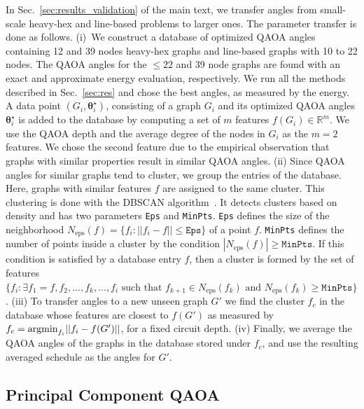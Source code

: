 \documentclass[twocolumn,
english,
aps,
pra,
10pt,
longbibliography,
superscriptaddress,
amsmath,
amssymb,
floatfix
]{revtex4-2}
\begin{document}
{In Sec.~\ref{sec:results_validation} of the main text, we transfer angles from small-scale heavy-hex and line-based problems to larger ones.
The parameter transfer is done as follows.
(i)~We construct a database of optimized QAOA angles containing 12 and 39 nodes heavy-hex graphs and line-based graphs with 10 to 22 nodes.
The QAOA angles for the  $\leq 22$ and 39 node graphs are found with an exact and approximate energy evaluation, respectively.
We run all the methods described in Sec.~\ref{sec:res} and chose the best angles, as measured by the energy.  
A data point $(G_i, \boldsymbol{\theta}_i^\star)$, consisting of a graph $G_i$ and its optimized QAOA angles $\boldsymbol{\theta}^\star_i$ is added to the database by computing a set of $m$ features $f(G_i)\in\mathbb{R}^m$.
We use the QAOA depth and the average degree of the nodes in $G_i$ as the $m=2$ features. 
We chose the second feature due to the empirical observation that graphs with similar properties result in similar QAOA angles.
(ii)
Since QAOA angles for similar graphs tend to cluster, we group the entries of the database.
Here, graphs with similar features $f$ are assigned to the same cluster. 
This clustering is done with the DBSCAN algorithm~\cite{ester1996density, pedregosa2011scikit}.
It detects clusters based on density and has two parameters \texttt{Eps} and \texttt{MinPts}. 
\texttt{Eps} defines the size of the neighborhood $N_\text{eps}(f) = \{f_i: ||f_i-f||\leq \texttt{Eps}\}$ of a point $f$.
\texttt{MinPts} defines the number of points inside a cluster by the condition $|N_\text{eps}(f)|\geq \texttt{MinPts}$. 
If this condition is satisfied by a database entry $f$, then a cluster is formed by the set of features $\{f_i: \exists f_1 = f, f_2,...,f_k,...,f_i \text{ such that } f_{k+1}\in N_\text{eps}(f_k) \text{ and }  N_\text{eps}(f_k) \geq \texttt{MinPts}\}$.
(iii) To transfer angles to a new unseen graph $G'$ we find the cluster $f_c$ in the database whose features are closest to $f(G')$ as measured by $f_c={\rm argmin}_{f_i}||f_i-f(G')||$, for a fixed circuit depth.
(iv) Finally, we average the QAOA angles of the graphs in the database stored under $f_c$, and use the resulting averaged schedule as the angles for $G'$. 

\subsection{Principal Component QAOA\label{app:qaoa_pca}}

}
\end{document}
